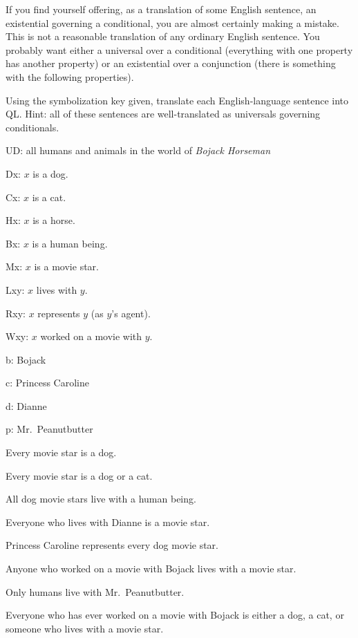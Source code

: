 If you find yourself offering, as a translation of some English sentence, an existential governing a conditional, you are almost certainly making a mistake. This is not a reasonable translation of any ordinary English sentence. You probably want either a universal over a conditional (everything with one property has another property) or an existential over a conjunction (there is something with the following properties). 

\practiceproblems

\problempart
\label{pr.QLbojackall}
Using the symbolization key given, translate each English-language sentence into QL. Hint: all of these sentences are well-translated as universals governing conditionals.
\begin{ekey}
\item[UD:] all humans and animals in the world of \emph{Bojack Horseman}
\item[Dx:] $x$ is a dog.
\item[Cx:] $x$ is a cat.
\item[Hx:] $x$ is a horse.
\item[Bx:] $x$ is a human being.
\item[Mx:] $x$ is a movie star.
\item[Lxy:] $x$ lives with $y$.
\item[Rxy:] $x$ represents $y$ (as $y$'s agent).
\item[Wxy:] $x$ worked on a movie with $y$.
\item[b:] Bojack
\item[c:] Princess Caroline
\item[d:] Dianne
\item[p:] Mr.\ Peanutbutter
\end{ekey}
\begin{earg}
\item Every movie star is a dog.
\item Every movie star is a dog or a cat.
\item All dog movie stars live with a human being.
\item Everyone who lives with Dianne is a movie star.
\item Princess Caroline represents every dog movie star.
\item Anyone who worked on a movie with Bojack lives with a movie star.
\item Only humans live with Mr.\ Peanutbutter.
\item Everyone who has ever worked on a movie with Bojack is either a dog, a cat, or someone who lives with a movie star.
\end{earg}

